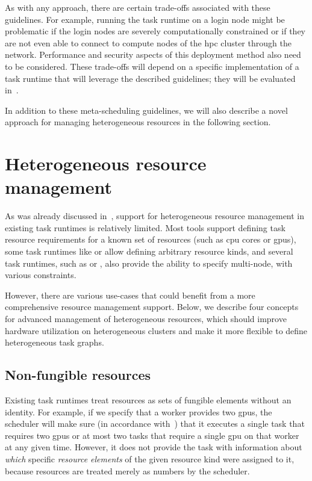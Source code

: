 As with any approach, there are certain trade-offs associated with these guidelines. For example,
running the task runtime on a login node might be problematic if the login nodes are severely
computationally constrained or if they are not even able to connect to compute nodes of the
\gls{hpc} cluster through the network. Performance and security aspects of this
deployment method also need to be considered. These trade-offs will depend on a specific
implementation of a task runtime that will leverage the described guidelines; they will be
evaluated in~.

In addition to these meta-scheduling guidelines, we will also describe a novel approach for
managing heterogeneous resources in the following section.

\section{Heterogeneous resource management}
\label{sec:heterogeneous-resources}
As was already discussed in~, support for heterogeneous resource management
in existing task runtimes is relatively limited. Most tools support defining task resource
requirements for a known set of resources (such as \gls{cpu} cores or
\glspl{gpu}), some task runtimes like \dask{} or
\snakemake{} allow defining arbitrary resource kinds, and several task runtimes, such as
\pycompss{} or \ray{}, also provide the ability to specify multi-node,
with various constraints.

However, there are various use-cases that could benefit from a more comprehensive resource
management support. Below, we describe four concepts for advanced management of heterogeneous
resources, which should improve hardware utilization on heterogeneous clusters and make it more
flexible to define heterogeneous task graphs.

\subsection{Non-fungible resources}
Existing task runtimes treat resources as sets of fungible elements without an identity. For
example, if we specify that a \dask{} worker provides two \glspl{gpu},
the \dask{} scheduler will make sure (in accordance with~)
that it executes a single task that requires two \glspl{gpu} or at most two tasks that
require a single \gls{gpu} on that worker at any given time. However, it does not
provide the task with information about \emph{which} specific \emph{resource elements} of
the given resource kind were assigned to it, because resources are treated merely as numbers by the
\dask{} scheduler.

